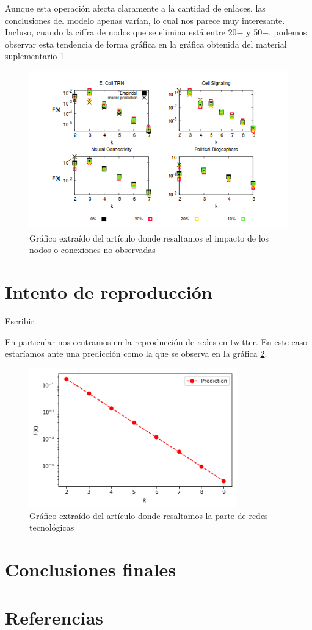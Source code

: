 \documentclass[1p]{elsarticle}
\begin{document}
Aunque esta operación afecta claramente a la cantidad de enlaces, las conclusiones del modelo apenas varían, lo cual nos parece muy interesante. Incluso, cuando la ciffra de nodos que se elimina está entre 20$-$ y 50$-$. podemos observar esta tendencia de forma gráfica en la gráfica obtenida del material suplementario \ref{h4}
\begin{figure}
	\centering
	\includegraphics[width=15cm]{graf_3.png}
	\caption{Gráfico extraído del artículo donde resaltamos el impacto de los nodos o conexiones no observadas}
	\label{h4}
\end{figure}

\section{Intento de reproducción}

Escribir.

En particular nos centramos en la reproducción de redes en twitter. En este caso estaríamos ante una predicción como la que se observa en la gráfica \ref{h2}.
\begin{figure}
	\centering
	\includegraphics[width=9cm]{graf_4.png}
	\caption{Gráfico extraído del artículo donde resaltamos la parte de redes tecnológicas}
	\label{h2}
\end{figure}

\section{Conclusiones finales}
\section*{Referencias}

\end{document}
